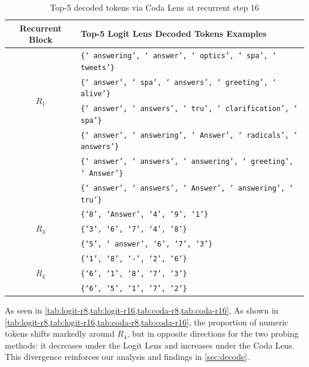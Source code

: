 \documentclass{article} %
\begin{document}
    \begin{table}[H]
        \centering
        \begin{tabularx}{\columnwidth}{|c|X|}
            \hline
            \textbf{Recurrent Block} & \textbf{Top-5 Logit Lens Decoded Tokens Examples} \\
            \hline
            \multirow{4}{*}{$R_1$} 
                & \texttt{\{` answering', ` answer', ` optics', ` spa', ` tweets'\}} \\
                & \texttt{\{` answer', ` spa', ` answers', ` greeting', ` alive'\}} \\
                & \texttt{\{` answer', ` answers', ` tru', ` clarification', ` spa'\}} \\
            \hline
            \multirow{5}{*}{$R_2$} 
                & \texttt{\{` answer', ` answering', ` Answer', ` radicals', ` answers'\}} \\
                & \texttt{\{` answer', ` answers', ` answering', ` greeting', ` Answer'\}} \\
                & \texttt{\{` answer', ` answers', ` Answer', ` answering', ` tru'\}} \\
            \hline
            \multirow{3}{*}{$R_3$} 
                & \texttt{\{`8', `Answer', `4', `9', `1'\}} \\
                & \texttt{\{`3', `6', `7', `4', `8'\}} \\
                & \texttt{\{`5', ` answer', `6', `7', `3'\}} \\
            \hline
            \multirow{3}{*}{$R_4$} 
                & \texttt{\{`1', `8', `-', `2', `6'\}} \\
                & \texttt{\{`6', `1', `8', `7', `3'\}} \\
                & \texttt{\{`6', `5', `1', `7', `2'\}} \\
            \hline
        \end{tabularx}
        \caption{Top-5 decoded tokens via Coda Lens at recurrent step 16}
        \label{tab:coda-r16}
    \end{table}

As seen in \cref{tab:logit-r8,tab:logit-r16,tab:coda-r8,tab:coda-r16}, As shown in \cref{tab:logit-r8,tab:logit-r16,tab:coda-r8,tab:coda-r16}, the proportion of numeric tokens shifts markedly around $R_4$, but in opposite directions for the two probing methods: it decreases under the Logit Lens and increases under the Coda Lens. This divergence reinforces our analysis and findings in \cref{sec:decode}.
\end{document}
